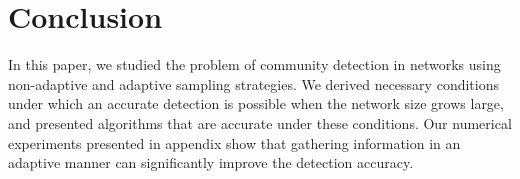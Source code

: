 \documentclass[12pt]{colt}%
\begin{document}




\section{Conclusion}\label{sec:conclusion}
In this paper, we studied the problem of community detection in networks using non-adaptive and adaptive sampling strategies. We derived necessary conditions under which an accurate detection is possible when the network size grows large, and presented algorithms that are accurate under these conditions. Our numerical experiments presented in appendix show that gathering information in an adaptive manner can significantly improve the detection accuracy.


\clearpage
\newpage





\end{document}
